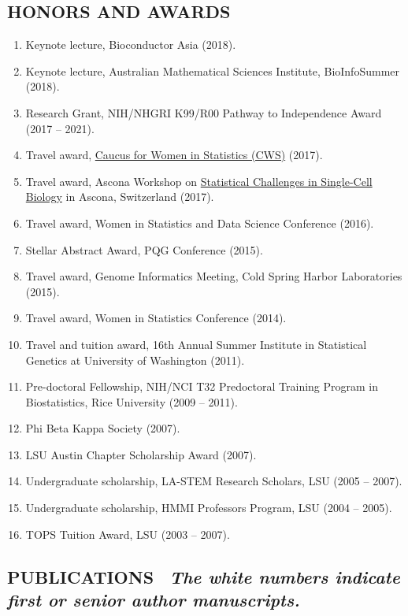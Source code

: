 \documentclass[10pt]{article}
\newcommand{\mydot}[1]{\begin{enumerate}[label=$\circ$,leftmargin=\parindent]\setlength{\itemsep}{#1}}
\newcommand{\ee}{\end{enumerate}}
\begin{document}
\subsection*{HONORS AND AWARDS}

\mydot{-0.1em}

\item Keynote lecture, Bioconductor Asia (2018).
\item Keynote lecture, Australian Mathematical Sciences Institute, BioInfoSummer (2018).
\item Research Grant, NIH/NHGRI K99/R00 Pathway to Independence Award (2017 -- 2021). 
\item Travel award, \href{https://cwstat.org}{Caucus for Women in Statistics (CWS)} (2017).
\item Travel award, Ascona Workshop on \href{https://www.bsse.ethz.ch/cbg/cbg-news/ascona-2017.html}{Statistical Challenges in Single-Cell Biology} in Ascona, Switzerland (2017).
\item Travel award, Women in Statistics and Data Science Conference (2016).
\item Stellar Abstract Award, PQG Conference (2015).
\item Travel award, Genome Informatics Meeting, Cold Spring Harbor Laboratories (2015).
\item Travel award, Women in Statistics Conference (2014).
\item Travel and tuition award, 16th Annual Summer  Institute in Statistical Genetics at University of Washington (2011).
\item Pre-doctoral Fellowship, NIH/NCI T32 Predoctoral Training Program in Biostatistics, Rice University (2009 -- 2011).
\item Phi Beta Kappa Society (2007).
\item LSU Austin Chapter Scholarship Award (2007).
\item Undergraduate scholarship, LA-STEM Research Scholars, LSU (2005 -- 2007).
\item Undergraduate scholarship, HMMI Professors Program, LSU (2004 -- 2005).
\item TOPS Tuition Award, LSU (2003 -- 2007).

\ee



\subsection*{PUBLICATIONS \ {\tiny \em  The white numbers indicate first or senior author manuscripts.}}
\end{document}
